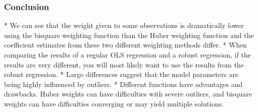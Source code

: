 \subsubsection{Conclusion}

* We can see that the weight given to some observations is dramatically lower using the bisquare weighting function than the Huber weighting function and the coefficient estimates from these two different weighting methods differ. 
* When comparing the results of a regular OLS regression and a robust regression, if the results are very different, you will most likely want to use the results from the robust regression. 
* Large differences suggest that the model parameters are being highly influenced by outliers. 
* Different functions have advantages and drawbacks. Huber weights can have difficulties with severe outliers, and bisquare weights can have difficulties converging or may yield multiple solutions. 


